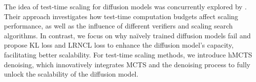 The idea of test-time scaling for diffusion models was concurrently explored by \citet{ma2025inferencetimescalingdiffusionmodels}. Their approach investigates how test-time computation budgets affect scaling performance, as well as the influence of different verifiers and scaling search algorithms. In contrast, we focus on why na\"ively trained diffusion models fail and propose KL loss and LRNCL loss to enhance the diffusion model’s capacity, facilitating better scalability. For test-time scaling methods, we introduce hMCTS denoising, which innovatively integrates MCTS and the denoising process to fully unlock the scalability of the diffusion model.








